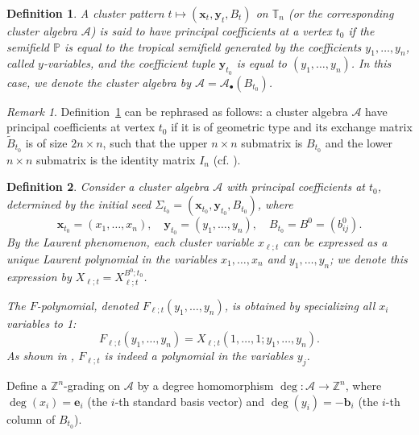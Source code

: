 \documentclass{article}
\newtheorem{definition}{Definition}
\theoremstyle{remark}
\newtheorem{remark}{Remark}
\begin{document}
\begin{definition}\label{def:principal_coefficients}
A cluster pattern $t \mapsto\left(\mathbf{x}_t, \mathbf{y}_t, B_t\right)$ on $\mathbb{T}_n$ (or the corresponding cluster algebra $\mathcal{A}$) is said to have \emph{principal coefficients} at a vertex $t_0$ if the semifield $\mathbb{P}$ is equal to the tropical semifield generated by the coefficients $y_1, \ldots, y_n$, called $y$-variables, and the coefficient tuple $\mathbf{y}_{t_0}$ is equal to $(y_1, \ldots, y_n)$. In this case, we denote the cluster algebra by $\mathcal{A}=\mathcal{A}_{\bullet}\left(B_{t_0}\right)$.
\end{definition}

\begin{remark}
Definition~\ref{def:principal_coefficients} can be rephrased as follows: a cluster algebra $\mathcal{A}$ have principal coefficients at vertex $t_0$ if it is of geometric type and its exchange matrix $\tilde{B}_{t_0}$ is of size $2n \times n$, such that the upper $n \times n$ submatrix is $B_{t_0}$ and the lower $n \times n$ submatrix is the identity matrix $I_n$ (cf. \cite{FZ2002}).
\end{remark}

\begin{definition}
Consider a cluster algebra $\mathcal{A}$ with principal coefficients at $t_0$, determined by the initial seed $\Sigma_{t_0}=\left(\mathbf{x}_{t_0}, \mathbf{y}_{t_0}, B_{t_0}\right)$, where
\[
\mathbf{x}_{t_0}=\left(x_1, \ldots, x_n\right), \quad \mathbf{y}_{t_0}=\left(y_1, \ldots, y_n\right), \quad B_{t_0}=B^0=\left(b_{i j}^0\right).
\]
By the Laurent phenomenon, each cluster variable $x_{\ell ; t}$ can be expressed as a unique Laurent polynomial in the variables $x_1, \ldots, x_n$ and $y_1, \ldots, y_n$; we denote this expression by $X_{\ell ; t} = X_{\ell ; t}^{B^0 ; t_0}$.

The \emph{$F$-polynomial}, denoted $F_{\ell ; t}(y_1, \ldots, y_n)$, is obtained by specializing all $x_i$ variables to 1:
\[
F_{\ell ; t}\left(y_1, \ldots, y_n\right)=X_{\ell ; t}\left(1, \ldots, 1 ; y_1, \ldots, y_n\right).
\]
As shown in \cite{FZ2007}, $F_{\ell ; t}$ is indeed a polynomial in the variables $y_j$.
\end{definition}

Define a $\mathbb{Z}^n$-grading on $\mathcal{A}$ by a degree homomorphism $\deg:\mathcal{A} \to \mathbb{Z}^n$, where $\deg(x_i) = \mathbf{e}_i$ (the $i$-th standard basis vector) and $\deg(y_i) = -\mathbf{b}_i$ (the $i$-th column of $B_{t_0}$).
\end{document}
